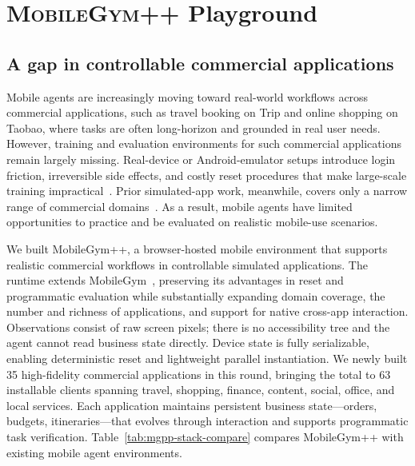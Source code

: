 \section{\textsc{MobileGym++} Playground}
\label{sec:mobilegym++}
\label{sec:method}

\subsection{A gap in controllable commercial applications}
\label{sec:mgpp-env}

Mobile agents are increasingly moving toward real-world workflows across commercial applications, such as travel booking on Trip and online shopping on Taobao, where tasks are often long-horizon and grounded in real user needs. However, training and evaluation environments for such commercial applications remain largely missing. 
Real-device or Android-emulator setups introduce login friction, irreversible side effects, and costly reset procedures that make large-scale training impractical~\citep{rawles2025androidworld,kong2026mobileworld}. Prior simulated-app work, meanwhile, covers only a narrow range of commercial domains~\citep{wu2026mobilegym,trivedi2024appworld}.
As a result, mobile agents have limited opportunities to practice and be evaluated on realistic mobile-use scenarios.

We built MobileGym++, a browser-hosted mobile environment that supports realistic commercial workflows in controllable simulated applications. The runtime extends MobileGym~\citep{wu2026mobilegym}, preserving its advantages in reset and programmatic evaluation while substantially expanding domain coverage, the number and richness of applications, and support for native cross-app interaction. Observations consist of raw screen pixels; there is no accessibility tree and the agent cannot read business state directly. Device state is fully serializable, enabling deterministic reset and lightweight parallel instantiation. We newly built 35 high-fidelity commercial applications in this round, bringing the total to 63 installable clients spanning travel, shopping, finance, content, social, office, and local services. Each application maintains persistent business state---orders, budgets, itineraries---that evolves through interaction and supports programmatic task verification.
Table~\ref{tab:mgpp-stack-compare} compares MobileGym++ with existing mobile agent environments.

